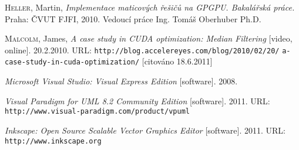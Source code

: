 \begin{thebibliography}{99}
        \textsc{Heller}, Martin, \textit{Implementace maticových řešičů na GPGPU.
        Bakalářská práce.} Praha: ČVUT FJFI, 2010. Vedoucí práce Ing. Tomáš Oberhuber Ph.D.

        \textsc{Malcolm}, James, \textit{A case study in CUDA optimization: Median Filtering} [video, online]. 20.2.2010.
        URL: {\tt http://blog.accelereyes.com/blog/2010/02/20/} {\tt a-case-study-in-cuda-optimization/} [citováno 18.6.2011]

        \textit{Microsoft Visual Studio: Visual  Express Edition} [software]. 2008.
        
        \textit{Visual Paradigm for UML 8.2 Community Edition} [software]. 2011.
         URL: {\tt http://www.visual-paradigm.com/product/vpuml}
        
        \textit{Inkscape: Open Source Scalable Vector Graphics Editor} [software]. 2011.
         URL: {\tt http://www.inkscape.org}

\end{thebibliography} 